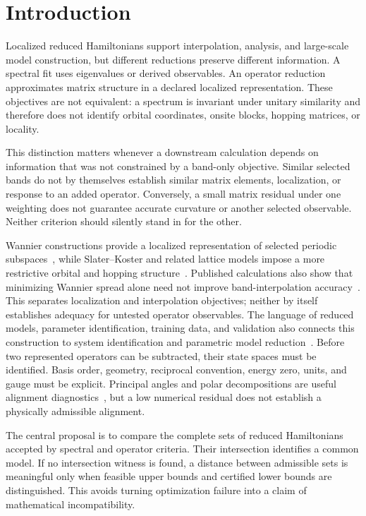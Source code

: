 \documentclass[preprint,12pt]{elsarticle}
\begin{document}
\section{Introduction}
\label{sec:introduction}

Localized reduced Hamiltonians support interpolation, analysis, and
large-scale model construction, but different reductions preserve different
information. A spectral fit uses eigenvalues or derived observables. An
operator reduction approximates matrix structure in a declared localized
representation. These objectives are not equivalent: a spectrum is invariant
under unitary similarity and therefore does not identify orbital coordinates,
onsite blocks, hopping matrices, or locality.

This distinction matters whenever a downstream calculation depends on
information that was not constrained by a band-only objective. Similar
selected bands do not by themselves establish similar matrix elements,
localization, or response to an added operator. Conversely, a small matrix
residual under one weighting does not guarantee accurate curvature or another
selected observable. Neither criterion should silently stand in for the other.

Wannier constructions provide a localized representation of selected periodic
subspaces~\cite{marzari2012,souza2001,pizzi2020,yates2007,marzari1997,panati2013},
while Slater--Koster and related lattice models impose a more restrictive
orbital and hopping structure~\cite{slater1954,vogl1983}. Published calculations
also show that minimizing Wannier spread alone need not improve band-interpolation
accuracy~\cite{damle2018}. This separates localization and interpolation
objectives; neither by itself establishes adequacy for untested operator
observables. The language of
reduced models, parameter identification, training data, and validation also
connects this construction to system identification and parametric model
reduction~\cite{ljung1999,benner2015}. Before two represented operators can be
subtracted, their state spaces must be identified. Basis order, geometry,
reciprocal convention, energy zero, units, and gauge must be explicit.
Principal angles and polar decompositions are useful alignment
diagnostics~\cite{bjork1973,higham1986}, but a low numerical residual does not
establish a physically admissible alignment.

The central proposal is to compare the complete sets of reduced Hamiltonians
accepted by spectral and operator criteria. Their intersection identifies a
common model. If no intersection witness is found, a distance between
admissible sets is meaningful only when feasible upper bounds and certified
lower bounds are distinguished. This avoids turning optimization failure into
a claim of mathematical incompatibility.
\end{document}
